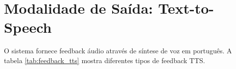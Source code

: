 \documentclass{report}
\begin{document}
\section{Modalidade de Saída: Text-to-Speech}

O sistema fornece feedback áudio através de síntese de voz em português. A tabela \ref{tab:feedback_tts} mostra diferentes tipos de feedback TTS.

\end{document}
